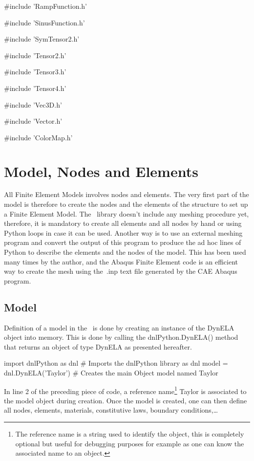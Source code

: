 \#include 'RampFunction.h'

\#include 'SinusFunction.h'

\#include 'SymTensor2.h'

\#include 'Tensor2.h'

\#include 'Tensor3.h'

\#include 'Tensor4.h'

\#include 'Vec3D.h'

\#include 'Vector.h'

\#include 'ColorMap.h'

\section{Model, Nodes and Elements}

All Finite Element Models involves nodes and elements. The very first part of the model is therefore to create the nodes and the elements of the structure to set up a Finite Element Model. The \DynELA~library doesn't include any meshing procedure yet, therefore, it is mandatory to create all elements and all nodes by hand or using Python loops in case it can be used. Another way is to use an external meshing program and convert the output of this program to produce the ad hoc lines of Python to describe the elements and the nodes of the model. This has been used many times by the author, and the Abaqus Finite Element code is an efficient way to create the mesh using the \textsf{.inp} text file generated by the CAE Abaqus program.

\subsection{Model}

Definition of a model in the \DynELA~is done by creating an instance of the \textsf{DynELA} object into memory. This is done by calling the \textsf{dnlPython.DynELA()} method that returns an object of type \textsf{DynELA} as presented hereafter.

\begin{PythonListing}
import dnlPython as dnl       # Imports the dnlPython library as dnl
model = dnl.DynELA('Taylor')  # Creates the main Object model named Taylor
\end{PythonListing}

In line 2 of the preceding piece of code, a reference name\footnote{The reference name is a string used to identify the object, this is completely optional but useful for debugging purposes for example as one can know the associated name to an object.} \textsf{Taylor} is associated to the model object during creation. Once the model is created, one can then define all nodes, elements, materials, constitutive laws, boundary conditions,\ldots

